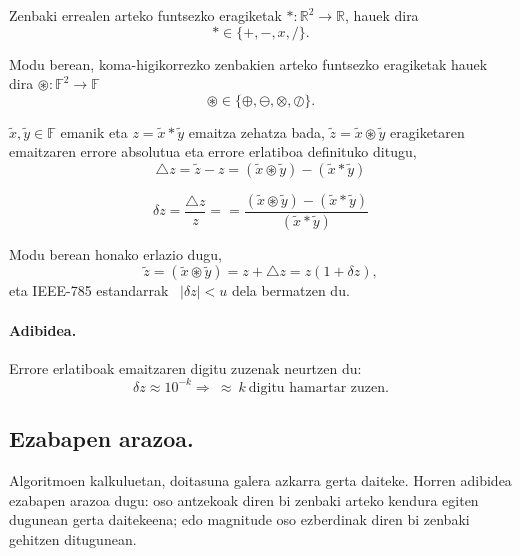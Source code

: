 Zenbaki errealen arteko funtsezko eragiketak  $\ast: \mathbb{R}^2\rightarrow \mathbb{R}$, hauek dira
\begin{equation*}
\ast\in \{+,-,x,/ \}.
\end{equation*}

Modu berean, koma-higikorrezko zenbakien arteko funtsezko eragiketak hauek dira $\circledast: \mathbb{F}^2\rightarrow \mathbb{F}$
\begin{equation*}
\circledast\in \{\oplus,\ominus,\otimes,\oslash \}.
\end{equation*}

$\tilde x,\tilde y \in \mathbb{F}$ emanik eta $z= \tilde x \ast \tilde y$ emaitza zehatza bada, $\tilde z= \tilde x \circledast \tilde y$ eragiketaren emaitzaren errore absolutua eta errore erlatiboa definituko ditugu,
\begin{equation*}
\triangle z=\tilde z-z =(\tilde x \circledast \tilde y) -(\tilde x \ast \tilde y)
\end{equation*} 

\begin{equation*}
\delta z=\frac{\triangle z}{z}==\frac{(\tilde x \circledast \tilde y) -(\tilde x \ast \tilde y)}{(\tilde x \ast \tilde y)}
\end{equation*} 

Modu berean honako erlazio dugu,
\begin{equation*}
\tilde z=(\tilde x \circledast \tilde y)=z+\triangle z=z(1+\delta z),  
\end{equation*}
eta IEEE-785 estandarrak \ $|\delta z|<u$ dela bermatzen du.


\paragraph*{\textbf{Adibidea.}}

Errore erlatiboak emaitzaren digitu zuzenak neurtzen du:
\begin{equation*}
\delta z \approx 10^{-k} \Rightarrow \ \approx \ k \ \mbox{digitu hamartar zuzen}.
\end{equation*}  

\subsection*{Ezabapen arazoa.}

Algoritmoen kalkuluetan, doitasuna galera azkarra gerta daiteke. Horren adibidea ezabapen arazoa dugu: oso antzekoak diren bi zenbaki arteko kendura egiten dugunean gerta daitekeena; edo magnitude oso ezberdinak diren bi zenbaki gehitzen ditugunean. 

